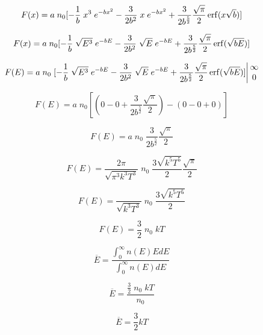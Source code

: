 \documentclass[11pt,a4paper]{article}
\begin{document}
\begin{equation}
    F(x) = a \; n_0 [-\frac{1}{b} \; x^3 \; e^{-bx^2} - \frac{3}{2b^2} \; x \; e^{-bx^2} + \frac{3}{2b^{\frac{5}{2}}} \frac{\sqrt{\pi}}{2} \erf(x\sqrt{b})]
\end{equation}

\begin{equation}
    F(x) = a \; n_0 [-\frac{1}{b} \; \sqrt{E^3} \; e^{-bE} - \frac{3}{2b^2} \; \sqrt{E} \; e^{-bE} + \frac{3}{2b^{\frac{5}{2}}} \frac{\sqrt{\pi}}{2} \erf(\sqrt{bE})]
\end{equation}

\begin{equation}
    F(E) = a \; n_0 \left.[-\frac{1}{b} \; \sqrt{E^3} \; e^{-bE} - \frac{3}{2b^2} \; \sqrt{E} \; e^{-bE} + \frac{3}{2b^{\frac{5}{2}}} \frac{\sqrt{\pi}}{2} \erf(\sqrt{bE})]\right\vert \begin{matrix} \infty \\ 0 \end{matrix}
\end{equation}

\begin{equation}
    F(E) = a \; n_0 [(0 - 0 + \frac{3}{2b^{\frac{5}{2}}} \frac{\sqrt{\pi}}{2}) - (0 - 0 + 0)]
\end{equation}

\begin{equation}
    F(E) = a \; n_0 \; \frac{3}{2b^{\frac{5}{2}}} \frac{\sqrt{\pi}}{2} 
\end{equation}

\begin{equation}
    F(E) = \frac{2\pi}{\sqrt{\pi^3 k^3 T^3}} \; n_0 \; \frac{3\sqrt{k^5 T^5}}{2} \frac{\sqrt{\pi}}{2} 
\end{equation}

\begin{equation}
    F(E) = \frac{}{\sqrt{k^3 T^3}} \; n_0 \; \frac{3\sqrt{k^5 T^5}}{2} 
\end{equation}

\begin{equation}
    F(E) = \frac{3}{2} \; n_0 \; k T 
\end{equation}

\newpage

\begin{equation}
    \overline{E} = \frac{\int_0^{\infty} n(E)EdE}{\int_0^{\infty} n(E)dE}
\end{equation}

\begin{equation}
    \overline{E} = \frac{\frac{3}{2} \; n_0 \; k T}{n_0} 
\end{equation}

\begin{equation}
    \overline{E} = \frac{3}{2} k T 
\end{equation}
\end{document}
